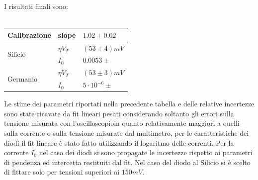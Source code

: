 \documentclass{amsart}
\begin{document}
    I risultati finali sono:\\
    \hfill \\
    \begin{center}
        \begin{tabular}{|p{2cm}|p{1cm}|p{2cm}|}
            \hline
            Calibrazione & slope & $1.02 \pm 0.02$ \\
            \hline
            \multirow{2}{*}{Silicio}      & $\eta V_T$ & $(53 \pm 4)mV$ \\
                                        & $I_0$ & $0.0053 \pm $ \\
            \hline
            \multirow{2}{*}{Germanio}      & $\eta V_T$ & $(53 \pm 3)mV$ \\
                                        & $I_0$ & $ 5 \cdot 10^{-6} \pm $\\
            \hline  
        \end{tabular}
    \end{center}
    \vspace{0.5cm}
    Le stime dei parametri riportati nella precedente tabella e delle relative incertezze sono state ricavate da fit lineari pesati
    considerando soltanto gli errori sulla tensione misurata con l'oscilloscopioin quanto relativamente maggiori 
    a quelli sulla corrente o sulla tensione misurate dal multimetro, per le caratteristiche dei diodi il fit lineare è stato 
    fatto utilizzando il logaritmo delle correnti. Per la corrente $I_0$ nel caso dei diodi si sono propagate le incertezze rispetto
    ai parametri di pendenza ed intercetta restituiti dal fit. Nel caso del diodo al Silicio si è scelto di fittare solo per tensioni
    superiori ai $150mV$.
\end{document}
